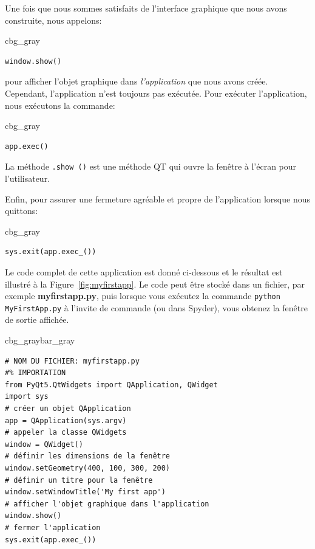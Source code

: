 \documentclass[%
oneside,                 %
final,                   %
10pt,french]{article}
\newenvironment{_cod_tight}[1]{
   \def\FrameCommand{\colorbox{#1}}
   \FrameRule0.6pt\MakeFramed {\FrameRestore}\vskip3mm}
   {\vskip0mm\endMakeFramed}
\newenvironment{cod}[1]{
\bgroup\rmfamily
\fboxsep=0mm\relax
\begin{_cod_tight}{#1}
\list{}{\parsep=-2mm\parskip=0mm\topsep=0pt\leftmargin=2mm
\rightmargin=2\leftmargin\leftmargin=4pt\relax}
\item\relax}
{\endlist\end{_cod_tight}\egroup}
\newenvironment{_pro_tight}[2]{
   \def\FrameCommand{\color{#2}\vrule width 1mm\normalcolor\colorbox{#1}}
   \FrameRule0.6pt\MakeFramed {\advance\hsize-2mm\FrameRestore}\vskip3mm}
   {\vskip0mm\endMakeFramed}
\newenvironment{pro}[2]{
\bgroup\rmfamily
\fboxsep=0mm\relax
\begin{_pro_tight}{#1}{#2}
\list{}{\parsep=-2mm\parskip=0mm\topsep=0pt\leftmargin=2mm
\rightmargin=2\leftmargin\leftmargin=4pt\relax}
\item\relax}
{\endlist\end{_pro_tight}\egroup}
\begin{document}
Une fois que nous sommes satisfaits de l'interface graphique que nous avons construite, nous appelons:
\begin{cod}{cbg_gray}\begin{verbatim}
window.show()
\end{verbatim}
\end{cod}
\noindent

pour afficher l'objet graphique dans \emph{l'application} que nous avons créée. Cependant, l'application n'est toujours pas exécutée. Pour exécuter l'application, nous exécutons la commande:
\begin{cod}{cbg_gray}\begin{verbatim}
app.exec()
\end{verbatim}
\end{cod}
\noindent
La méthode \texttt{.show ()} est une méthode QT qui ouvre la fenêtre à l'écran pour l'utilisateur.

Enfin, pour assurer une fermeture agréable et propre de l'application lorsque nous quittons:
\begin{cod}{cbg_gray}\begin{verbatim}
sys.exit(app.exec_())
\end{verbatim}
\end{cod}
\noindent
Le code complet de cette application est donné ci-dessous et le résultat est illustré à la Figure~\ref{fig:myfirstapp}. Le code peut être stocké dans un fichier, par exemple \textbf{myfirstapp.py}, puis lorsque vous exécutez la commande \texttt{python MyFirstApp.py} à l'invite de commande (ou dans Spyder), vous obtenez la fenêtre de sortie affichée.

\begin{pro}{cbg_gray}{bar_gray}\begin{verbatim}
# NOM DU FICHIER: myfirstapp.py
#% IMPORTATION
from PyQt5.QtWidgets import QApplication, QWidget
import sys
# créer un objet QApplication
app = QApplication(sys.argv)
# appeler la classe QWidgets
window = QWidget()
# définir les dimensions de la fenêtre
window.setGeometry(400, 100, 300, 200)
# définir un titre pour la fenêtre
window.setWindowTitle('My first app')
# afficher l'objet graphique dans l'application
window.show()
# fermer l'application
sys.exit(app.exec_())
\end{verbatim}
\end{pro}
\noindent
\end{document}
